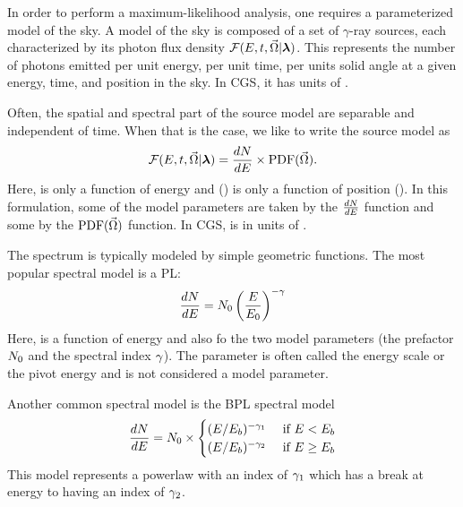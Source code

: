 
In order to perform a maximum-likelihood analysis, one requires
a parameterized model of the sky. A model of the sky
is composed of a set of $\gamma$-ray sources,
each characterized by its photon flux density 
  $\mathcal{F}(E,t,\vec\Omega|\boldsymbol{\lambda})$.
This represents
the number of photons emitted per unit energy, per unit
time, per units solid angle
at a given energy, time, and position in the sky.
In \ac{CGS}, it has units of \fluxdensityunits.

Often, the spatial and spectral part of the source model
are separable and independent of time. When that is the case,
we like to write the source model as
\begin{equation}
  \mathcal{F}(E,t,\vec\Omega|\boldsymbol{\lambda}) = \frac{dN}{dE} \times \text{PDF}(\vec\Omega).
\end{equation}
Here, \dnde is only a function of energy and \pdf(\solidangle) is only
a function of position (\solidangle).  In this formulation, some of the
model parameters \modelparams are taken by the $\frac{dN}{dE}$ function and some
by the $\text{PDF}(\vec\Omega)$ function.
In \ac{CGS}, \dnde is in units of \prefunits.

The spectrum \dnde is typically modeled by simple geometric functions.
The most popular spectral model is a \ac{PL}:
\begin{equation}
  \frac{dN}{dE} = N_0 \left(\frac{E}{E_0}\right)^{-\gamma}
\end{equation}
Here, \dnde is a function of energy and also fo the two model parameters
(the prefactor $N_0$ and the spectral index $\gamma$). The
parameter \Escale is often called the energy scale or the pivot
energy and is not considered a model parameter.

Another common spectral model is the \ac{BPL} spectral model
\begin{equation}
  \frac{dN}{dE} = N_0 \times
    \begin{cases}
      (E/E_b)^{-\gamma_1} &\text{ if }E<E_b \\
      (E/E_b)^{-\gamma_2} &\text{ if }E\ge E_b
    \end{cases}
\end{equation}
This model represents a powerlaw with an index 
of $\gamma_1$ which has a break at energy \Ebreak
to having an index of $\gamma_2$.

